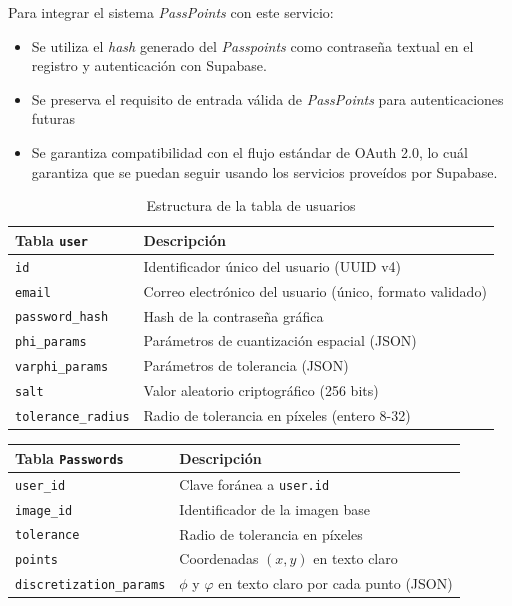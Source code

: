 Para integrar el sistema \textit{PassPoints} con este servicio:
\begin{itemize}
	\item Se utiliza el \textit{hash} generado del \textit{Passpoints} como contraseña textual en el registro y autenticaci\'on con Supabase.
	\item Se preserva el requisito de entrada válida de \textit{PassPoints} para autenticaciones futuras
	\item Se garantiza compatibilidad con el flujo estándar de OAuth 2.0, lo cu\'al garantiza que se puedan seguir usando los servicios prove\'idos por Supabase.
\end{itemize}


\begin{table}[ht]
	\centering
	\caption{Estructura de la tabla de usuarios}
	\label{tab:bd-esquema}
	\begin{tabularx}{\textwidth}{lX}
		\toprule
		\textbf{Tabla \texttt{user}} & \textbf{Descripción} \\
		\midrule
		\texttt{id} & Identificador único del usuario (UUID v4) \\
		\texttt{email} & Correo electrónico del usuario (único, formato validado) \\
		\texttt{password\_hash} & Hash de la contraseña gráfica \\
		\texttt{phi\_params} & Parámetros de cuantización espacial (JSON) \\
		\texttt{varphi\_params} & Parámetros de tolerancia (JSON) \\
		\texttt{salt} & Valor aleatorio criptográfico (256 bits) \\
		\texttt{tolerance\_radius} & Radio de tolerancia en píxeles (entero 8-32) \\
	
		\bottomrule
	\end{tabularx}
\end{table}


\begin{table}[ht]
	\centering
	\begin{tabularx}{\textwidth}{lX}
		\toprule
		\textbf{Tabla \texttt{Passwords}} & \textbf{Descripción} \\
		\midrule
		\texttt{user\_id} & Clave foránea a \texttt{user.id} \\
		\texttt{image\_id} & Identificador de la imagen base \\
		\texttt{tolerance} & Radio de tolerancia en píxeles \\
		\texttt{points} & Coordenadas $(x,y)$ en texto claro \\
		\texttt{discretization\_params} & $\phi$ y $\varphi$ en texto claro por cada punto (JSON) \\
		\bottomrule
	\end{tabularx}
\end{table}

